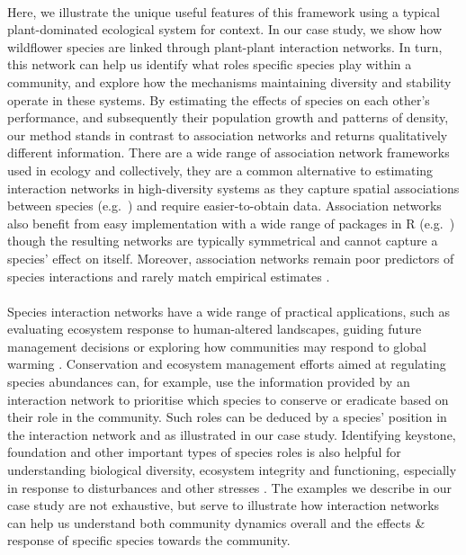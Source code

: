 \documentclass[a4,12pt]{article}
\begin{document}
    \paragraph{}
    Here, we illustrate the unique useful features of this framework using a typical plant-dominated ecological system for context. In our case study, we show how wildflower species are linked through  plant-plant interaction networks. In turn, this network can help us identify what roles specific species play within a community, and explore how the mechanisms maintaining diversity and stability operate in these systems. By estimating the effects of species on each other's performance, and subsequently their population growth and patterns of density, our method stands in contrast to association networks and returns qualitatively different information. There are a wide range of association network frameworks used in ecology \parencite{Burns2010, Losapio2018, Montesinos-Navarro2018} and collectively, they are a common alternative to estimating interaction networks in high-diversity systems as they capture spatial associations between species (e.g.\ \cite{Saiz2018}) and require easier-to-obtain data. Association networks also benefit from easy implementation with a wide range of packages in R (e.g.\ \cite{Griffith2016}) though the resulting networks are typically symmetrical and cannot capture a species' effect on itself. Moreover, association networks remain poor predictors of species interactions and rarely match empirical estimates \parencite{Sander2017,Barner2018, Thurman2019, Blanchet2020}.

    \paragraph{}
    Species interaction networks have a wide range of practical applications, such as evaluating ecosystem response to human-altered landscapes, guiding future management decisions \parencite{Ross2011} or exploring how communities may respond to global warming \parencite{Gorman2019}. Conservation and ecosystem management efforts aimed at regulating species abundances can, for example, use the information provided by an interaction network to prioritise which species to conserve or eradicate based on their role in the community. Such roles can be deduced by a species' position in the interaction network \parencite{Cirtwill2018a} and as illustrated in our case study. Identifying keystone, foundation and other important types of species roles is also helpful for understanding biological diversity, ecosystem integrity and functioning, especially in response to disturbances and other stresses \parencite{Nyakatya2008, Orwin2016, Losapio2017, Narwani2019}. The examples we describe in our case study are not exhaustive, but serve to illustrate how interaction networks can help us understand both community dynamics overall and the effects \& response of specific species towards the community. 
\end{document}
